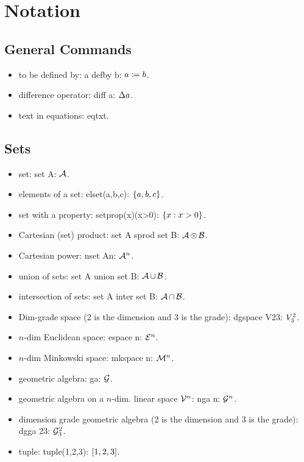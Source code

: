 \section{Notation}

\begin{multicols}{2}
\subsection{General Commands}
\begin{itemize}
\item to be defined by: a defby b: $a\coloneqq b$.
\item difference operator: diff a: $\Delta a$.
\item text in equations: eqtxt.
\end{itemize}


\subsection{Sets}
\begin{itemize}
\item set: set A: $\mathcal{A}$.
\item elements of a set: elset(a,b,c): $\left\lbrace{a,b,c}\right\rbrace$.
\item set with a property: setprop(x)(x>0): $\left\lbrace{{x}:{x>0}}\right\rbrace$.
\item Cartesian (set) product: set A sprod set B: $\mathcal{A}\operatorname{\otimes}\mathcal{B}$.
\item Cartesian power: nset An: $\mathcal{A}^{n}$.
\item union of sets: set A union set B: $\mathcal{A}\operatorname{\cup}\mathcal{B}$.
\item intersection of sets: set A inter set B: $\mathcal{A}\operatorname{\cap}\mathcal{B}$.
\item Dim-grade space (2 is the dimension and 3 is the grade): dgspace V23: ${V}^{2}_{3}$.
\item $n$-dim Euclidean space: espace n: $\mathcal{E}^{n}$.
\item $n$-dim Minkowski space: mkspace n: $\mathcal{M}^{n}$.
\item geometric algebra: ga: $\mathcal{G}$.
\item geometric algebra on a $n$-dim. linear space $\mathcal{V}^{n}$: nga n: $\mathcal{G}^{n}$.
\item dimension grade geometric algebra (2 is the dimension and 3 is the grade): dgga 23: $\mathcal{G}^{2}_{3}$.
\item tuple: tuple(1,2,3): $\left[{1,2,3}\right]$.
\end{itemize}



\end{multicols}
